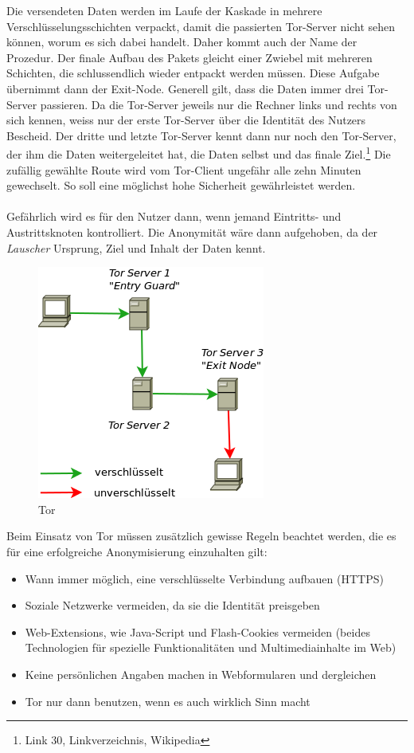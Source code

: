 Die versendeten Daten werden im Laufe der Kaskade in mehrere Verschlüsselungsschichten verpackt, damit die passierten Tor-Server nicht sehen können, worum es sich dabei handelt. Daher kommt auch der Name der Prozedur. Der finale Aufbau des Pakets gleicht einer Zwiebel mit mehreren Schichten, die  schlussendlich wieder entpackt werden müssen. Diese Aufgabe übernimmt dann der Exit-Node. Generell gilt, dass die Daten immer drei Tor-Server passieren. Da die Tor-Server jeweils nur die Rechner links und rechts von sich kennen, weiss nur der erste Tor-Server über die Identität des Nutzers Bescheid. Der dritte und letzte Tor-Server kennt dann nur noch den Tor-Server, der ihm die Daten weitergeleitet hat, die Daten selbst und das finale Ziel.\footnote{Link 30, Linkverzeichnis, Wikipedia}
Die zufällig gewählte Route wird vom Tor-Client ungefähr alle zehn Minuten gewechselt. So soll eine möglichst hohe Sicherheit gewährleistet werden.
\\
\\
Gefährlich wird es für den Nutzer dann, wenn jemand Eintritts- und Austrittsknoten kontrolliert. Die Anonymität wäre dann aufgehoben, da der \textit{Lauscher} Ursprung, Ziel und Inhalt der Daten kennt.

\begin{figure}[H]
\centering
\includegraphics[scale=0.7]{images/tor}
\caption{Tor}
\end{figure}

Beim Einsatz von Tor müssen zusätzlich gewisse Regeln beachtet werden, die es für eine erfolgreiche Anonymisierung einzuhalten gilt:
\begin{itemize}
\item Wann immer möglich, eine verschlüsselte Verbindung aufbauen (HTTPS)
\item Soziale Netzwerke vermeiden, da sie die Identität preisgeben
\item Web-Extensions, wie Java-Script und Flash-Cookies vermeiden (beides Technologien für spezielle Funktionalitäten und Multimediainhalte im Web)
\item Keine persönlichen Angaben machen in Webformularen und dergleichen
\item Tor nur dann benutzen, wenn es auch wirklich Sinn macht
\end{itemize}

